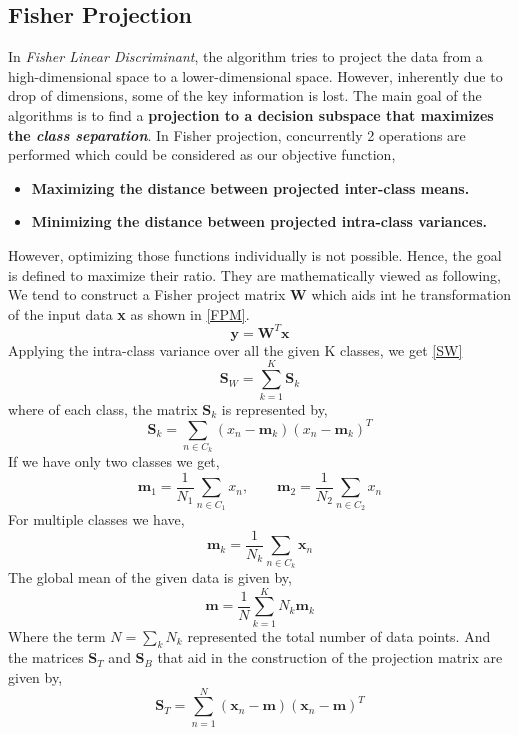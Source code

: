 \documentclass[12pt,twoside,a4paper]{article}
\begin{document}
\subsection{Fisher Projection}
In \textit{Fisher Linear Discriminant}, the algorithm tries to project the data from a high-dimensional space to a lower-dimensional space. However, inherently due to drop of dimensions, some of the key information is lost. The main goal of the algorithms is to find a \textbf{projection to a decision subspace that maximizes the \textit{class separation}}.
In Fisher projection, concurrently 2 operations are performed which could be considered as our objective function,
\begin{itemize}
    \item \textbf{Maximizing the distance between projected inter-class means.}
    \item \textbf{Minimizing the distance between projected intra-class variances.}
\end{itemize}
However, optimizing those functions individually is not possible. Hence, the goal is defined to maximize their ratio. They are mathematically viewed as following, \\
We tend to construct a Fisher project matrix \textbf{W} which aids int he transformation of the input data \textbf{x} as shown in \eqref{FPM}.
\begin{equation}\label{FPM}
    \textbf{y} = \textbf{W}^T\textbf{x}
\end{equation}
Applying the intra-class variance over all the given K classes, we get \eqref{SW}
\begin{equation}\label{SW}
    \textbf{S}_W = \sum_{k=1}^K\textbf{S}_k
\end{equation}
where of each class, the matrix $\textbf{S}_k$ is represented by,
\begin{equation}
    \textbf{S}_k = \sum_{n\in\textit{C}_k}(x_n - \textbf{m}_k)(x_n - \textbf{m}_k)^T
\end{equation}
If we have only two classes we get,
\begin{equation}
    \textbf{m}_1 = \frac{1}{N_1}\sum_{n\in\textit{C}_1}x_n,\qquad \textbf{m}_2 = \frac{1}{N_2}\sum_{n\in\textit{C}_2}x_n
\end{equation}
For multiple classes we have, 
\begin{equation}
    \textbf{m}_k = \frac{1}{N_k}\sum_{n\in\textit{C}_k}\textbf{x}_n
\end{equation}
The global mean of the given data is given by,
\begin{equation}\label{GLOBALM}
    \textbf{m} = \frac{1}{N}\sum_{k=1}^K N_k\textbf{m}_k
\end{equation}
Where the term $N = \sum_kN_k$ represented the total number of data points.
And the matrices $\textbf{S}_T$ and $\textbf{S}_B$ that aid in the construction of the projection matrix are given by, 
\begin{equation} \label{ST}
    \textbf{S}_T = \sum_{n=1}^N(\textbf{x}_n - \textbf{m})(\textbf{x}_n - \textbf{m})^T
\end{equation}
\end{document}
